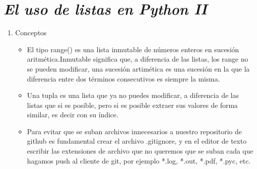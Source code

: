 \documentclass{book}
\begin{document}
\begin{enumerate}
\begin{itemize}
	\end{itemize}
	
	
\end{enumerate}


	\section{\textit{El uso de listas en Python II}}
\begin{flushright}
	\date{21 de enero de 2019}
\end{flushright}

\begin{enumerate}
	\item Conceptos
	\begin{itemize}
		\item El tipo range() es una lista inmutable de números enteros en sucesión aritmética.Inmutable significa que, a diferencia de las listas, los range no se pueden modificar, una sucesión artimética es una sucesión en la que la diferencia entre dos términos consecutivos es siempre la misma.
		
		\item Una tupla es una lista que ya no puedes modificar, a diferencia de las listas que si es posible, pero si es posible extraer sus valores de forma similar, es decir con su índice.
		\item Para evitar que se suban archivos innecesarios a nuestro repositorio de github es fundamental crear el archivo .gitignore, y en el editor de texto escribir las extensiones de archivo que no queremos que se suban cada que hagamos push al cliente de git, por ejemplo *.log, *.out, *.pdf, *.pyc, etc.
	\end{itemize}
	
	
	

\end{enumerate}
\end{document}
